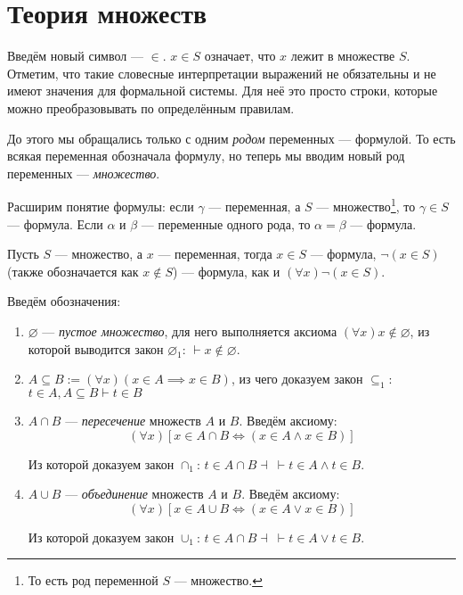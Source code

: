 \pagebreak

\section{Теория множеств}

Введём новый символ --- $\in$. ${x\in S}$ означает, что $x$ лежит в множестве $S$.
Отметим, что такие словесные интерпретации выражений не обязательны и не имеют
значения для формальной системы. Для неё это просто строки, которые можно преобразовывать
по определённым правилам.

До этого мы обращались только с одним {\it родом} переменных --- формулой.
То есть всякая переменная обозначала формулу, но теперь мы вводим новый род
переменных --- {\it множество}.

Расширим понятие формулы: если $\gamma$ --- переменная, а $S$ --- множество\footnote{
	То есть род переменной $S$ --- множество.
},
то $\gamma\in S$ --- формула. Если $\alpha$ и $\beta$ --- переменные одного рода,
то $\alpha=\beta$ --- формула.

Пусть $S$ --- множество, а $x$ --- переменная, тогда
$x\in S$ --- формула, $\lnot(x\in S)$ (также обозначается как $x\notin S$) --- формула,
как и $(\forall x)\lnot(x\in S)$.

Введём обозначения:
\newcommand\eset{\varnothing}
\begin{enumerate}
	\item{}$\eset$ --- {\it пустое множество}, для него выполняется аксиома
	${(\forall x)x\notin\eset}$, из которой выводится закон
	$\eset_1$: $\vdash x\notin\eset$.

	\item{}$A\subseteq B:=(\forall x)(x\in A\implies x\in B)$,
	из чего доказуем закон
	$\subseteq_1$: $t\in A,A\subseteq B\vdash t\in B$

	\item{}$A\cap B$ --- {\it пересечение} множеств $A$ и $B$. Введём аксиому:
	\[
		(\forall x)[x\in A\cap B\iff (x\in A\land x\in B)]
	\]

	Из которой доказуем закон $\cap_1$: $t\in A\cap B\dashv~\vdash t\in A\land t\in B$.

	\item{}$A\cup B$ --- {\it объединение} множеств $A$ и $B$. Введём аксиому:
	\[
		(\forall x)[x\in A\cup B\iff (x\in A\lor x\in B)]
	\]

	Из которой доказуем закон $\cup_1$: $t\in A\cap B\dashv~\vdash t\in A\lor t\in B$.
\end{enumerate}

